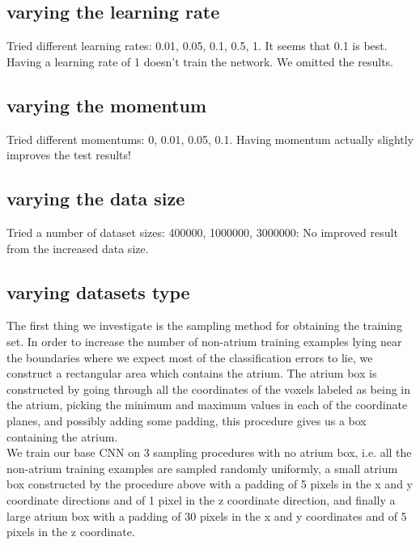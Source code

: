 \subsection{varying the learning rate}

Tried different learning rates: 0.01, 0.05, 0.1, 0.5, 1. It seems that 0.1 is best. Having a learning rate of 1 doesn't train the network.  We omitted the results.



\subsection{varying the momentum}

Tried different momentums: 0, 0.01, 0.05, 0.1. Having momentum actually slightly improves the test results!



\subsection{varying the data size}

Tried a number of dataset sizes: 400000, 1000000, 3000000: No improved result from the increased data size.

\subsection{varying datasets type}

The first thing we investigate is the sampling method for obtaining the training set. In order to increase the number of non-atrium training examples lying near the boundaries where we expect most of the classification errors to lie, we construct a rectangular area which contains the atrium. The atrium box is constructed by going through all the coordinates of the voxels labeled as being in the atrium, picking the minimum and maximum values in each of the coordinate planes, and possibly adding some padding, this procedure gives us a box containing the atrium. \\

We train our base CNN on 3 sampling procedures with no atrium box, i.e. all the non-atrium training examples are sampled randomly uniformly, a small atrium box constructed by the procedure above with a padding of 5 pixels in the x and y coordinate directions and of 1 pixel in the z coordinate direction, and finally a large atrium box with a padding of 30 pixels in the x and y coordinates and of 5 pixels in the z coordinate.\\

